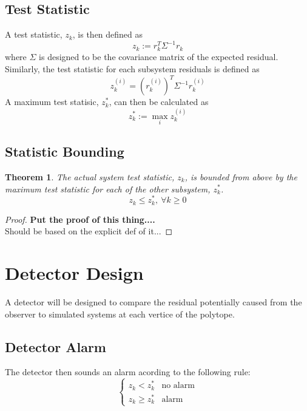 \documentclass[]{article}
\newtheorem{theorem}{Theorem}
\begin{document}
\subsection{Test Statistic}
A test statistic, $z_k$, is then defined as
\begin{equation}\label{eq:z_k_def}
    z_k := r_k^T \Sigma^{-1} r_k
\end{equation}
where $\Sigma$ is designed to be the covariance matrix of the expected residual. 
Similarly, the test statistic for each subsystem residuals is defined as
\begin{equation}\label{eq:z_k_i_def}
    z_k^{(i)} = (r_k^{(i)})^T \Sigma^{-1} r_k^{(i)}  
\end{equation}
A maximum test statisic, $z_k^*$, can then be calculated as
\begin{equation}\label{eq:z_k_max_def}
    z_k^* := \max_i z_k^{(i)}
\end{equation}

\subsection{Statistic Bounding}
\begin{theorem}
    The actual system test statistic, $z_k$, is bounded from above by the maximum 
    test statistic for each of the other subsystem, $z_k^*$.
    \begin{equation}
        z_k \leq z_k^*, \ \forall k \geq 0
    \end{equation}
\end{theorem}

\begin{proof}
    \textbf{Put the proof of this thing....}\\
    Should be based on the explicit def of it...
\end{proof}

\section{Detector Design}
A detector will be designed to compare the residual potentially caused from the observer 
to simulated systems at each vertice of the polytope.

\subsection{Detector Alarm}
The detector then sounds an alarm acording to the following rule:
\begin{equation}\label{eq:detector_alarm_rule}
    \begin{cases}
        z_k < z_k^*     &\text{no alarm}\\
        z_k \geq z_k^*  &\text{alarm}
    \end{cases}
\end{equation}
\end{document}
